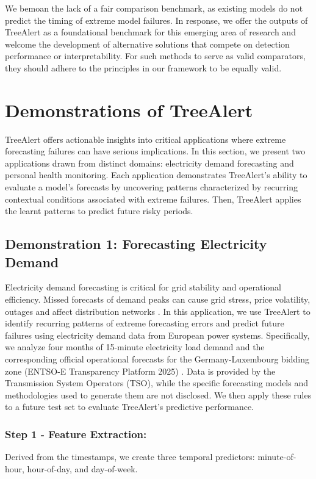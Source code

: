 \documentclass[preprint,12pt]{elsarticle}
\begin{document}
We bemoan the lack of a fair comparison benchmark, as existing models do not predict the timing of extreme model failures. In response, we offer the outputs of TreeAlert as a foundational benchmark for this emerging area of research and welcome the development of alternative solutions 
that compete on detection performance or interpretability. For such methods to serve as valid comparators, they should adhere to the principles in our framework to be equally valid.

\section{Demonstrations of TreeAlert }\label{sec-demo}

TreeAlert offers actionable insights into critical applications where extreme forecasting failures can have serious implications. In this section, we present two applications drawn from distinct domains: electricity demand forecasting and personal health monitoring. Each application demonstrates TreeAlert’s ability to evaluate a model’s forecasts by uncovering patterns characterized by recurring contextual conditions associated with extreme failures. Then, TreeAlert applies the learnt patterns to predict future risky periods.

\subsection{Demonstration 1: Forecasting Electricity Demand}

Electricity demand forecasting is critical for grid stability and operational efficiency. Missed forecasts of demand peaks can cause grid stress, price volatility, outages and affect distribution networks \citep{ciarreta2023, gilbert2023, steinbuks2019}. In this application, we use TreeAlert to identify recurring patterns of extreme forecasting errors and predict future failures using electricity demand data from European power systems. Specifically, we analyze four months of 15-minute electricity load demand and the corresponding official operational forecasts for the Germany-Luxembourg bidding zone (ENTSO-E Transparency Platform 2025) \citep{entsoe2025}. Data is provided by the Transmission System Operators (TSO), while the specific forecasting models and methodologies used to generate them are not disclosed. We then apply these rules to a future test set to evaluate TreeAlert's predictive performance.

\subsubsection*{Step 1 - Feature Extraction:}
Derived from the timestamps, we create three temporal predictors: minute-of-hour, hour-of-day, and day-of-week.
\end{document}
